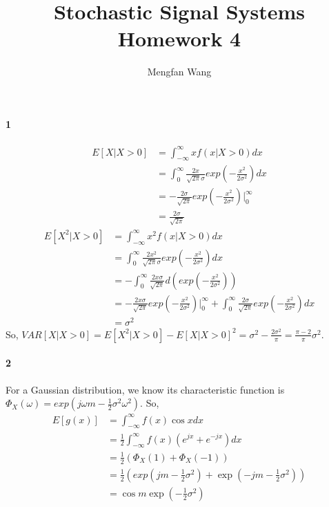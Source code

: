\documentclass[22pt]{article}
\author{Mengfan Wang}
\title{Stochastic Signal Systems Homework 4}
\begin{document}
		\maketitle 
	\paragraph{1}
	\begin{align}
	E[X|X>0] & = \int_{-\infty}^{\infty} xf(x|X>0)dx \\ 
	& = \int_{0}^{\infty} \frac{2x}{\sqrt{2 \pi}\sigma}exp(-\frac{x^2}{2 \sigma^2})dx\\
	& = -\frac{2 \sigma}{\sqrt{2 \pi}}exp(-\frac{x^2}{2 \sigma^2})|_{0}^{\infty}\\
	& = \frac{2 \sigma}{\sqrt{2 \pi}}
	\end{align}
	\begin{align}
	E[X^2|X>0] & = \int_{-\infty}^{\infty} x^2f(x|X>0)dx \\ 
	& = \int_{0}^{\infty} \frac{2x^2}{\sqrt{2 \pi}\sigma}exp(-\frac{x^2}{2 \sigma^2})dx \\
	& = -\int_{0}^{\infty} \frac{2x \sigma}{\sqrt{2 \pi}}d(exp(-\frac{x^2}{2 \sigma^2})) \\
	& = -\frac{2x \sigma}{\sqrt{2 \pi}}exp(-\frac{x^2}{2 \sigma^2})|_{0}^{\infty} + \int_{0}^{\infty} \frac{2\sigma}{\sqrt{2 \pi}}exp(-\frac{x^2}{2 \sigma^2})dx \\
	& = \sigma^2
	\end{align}
	So, $VAR[X|X>0] = E[X^2|X>0] - E[X|X>0]^2 = \sigma^2 - \frac{2 \sigma^2}{\pi} = \frac{\pi-2}{\pi}\sigma^2$.
    
    \paragraph{2}
    For a Gaussian distribution, we know its characteristic function is $\Phi_X(\omega) = exp(j \omega m- \frac{1}{2}\sigma^2 \omega^2)$.
    So,
    \begin{align}
    E[g(x)] & = \int_{-\infty}^{\infty} f(x)\cos x dx\\
 	& = \frac{1}{2}\int_{-\infty}^{\infty} f(x)(e^{jx}+e^{-jx})		dx\\
 	& = \frac{1}{2}(\Phi_X(1)+\Phi_X(-1))\\
 	& = \frac{1}{2}(exp(jm- \frac{1}{2}\sigma^2)+ \exp(-jm- \frac{1}{2}\sigma^2))\\
 	& = \cos m \exp(-\frac{1}{2}\sigma^2)
    \end{align}
\end{document}
